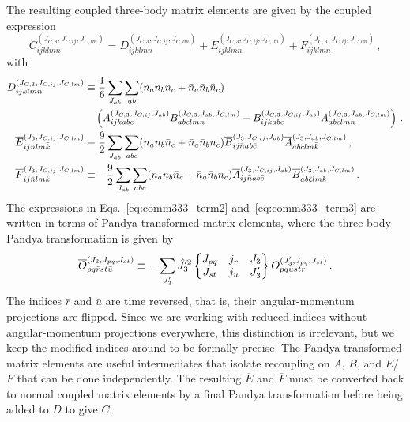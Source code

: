 The resulting coupled three-body matrix elements are given by the coupled expression
\begin{equation}
  C_{ijklmn}^{(J_{C,3}, J_{C,ij}, J_{C,lm})}
  = D_{ijklmn}^{(J_{C,3}, J_{C,ij}, J_{C,lm})}
  + E_{ijklmn}^{(J_{C,3}, J_{C,ij}, J_{C,lm})}
  + F_{ijklmn}^{(J_{C,3}, J_{C,ij}, J_{C,lm})}\,,
\end{equation}
with
\begin{align}
  \phantom{D_{ijklmn}^{(J_{C,3}, J_{C,ij}, J_{C,lm})}}
   & \begin{aligned}
    \mathllap{D_{ijklmn}^{(J_{C,3}, J_{C,ij}, J_{C,lm})}}
     & \equiv \frac{1}{6} \sum_{J_{ab}}
    \sum_{ab}
    (n_a n_b n_c + \bar{n}_a \bar{n}_b \bar{n}_c)
    \\
     & \quad \left(
    A_{ijkabc}^{(J_{C,3}, J_{C,ij}, J_{ab})}
    B_{abclmn}^{(J_{C,3}, J_{ab}, J_{C,lm})}
    - B_{ijkabc}^{(J_{C,3}, J_{C,ij}, J_{ab})}
    A_{abclmn}^{(J_{C,3}, J_{ab}, J_{C,lm})}
    \right)\,.
  \end{aligned}                         \\
   & \begin{aligned}
    \mathllap{\overline{E}_{ij\bar{n}lm\bar{k}}^{(J_{3},J_{C,ij},J_{C,lm})}} \equiv
    \frac{9}{2} \sum_{J_{ab}}
    \sum_{abc}
    (n_a n_b \bar{n}_c +  \bar{n}_a \bar{n}_b n_c)
    \overline{B}_{ij\bar{n}ab\bar{c}}^{(J_{3}, J_{C,ij}, J_{ab})}
    \overline{A}_{ab\bar{c}lm\bar{k}}^{(J_{3}, J_{ab}, J_{C,lm})}\,,
  \end{aligned}\label{eq:comm333_term2} \\
   & \begin{aligned}
    \mathllap{\overline{F}_{ij\bar{n}lm\bar{k}}^{(J_{3}, J_{C,ij}, J_{C,lm})}}
    \equiv -\frac{9}{2}
    \sum_{J_{ab}}
    \sum_{abc}
    (n_a n_b \bar{n}_c +  \bar{n}_a \bar{n}_b n_c)
    \overline{A}_{ij\bar{n}ab\bar{c}}^{(J_{3}, J_{C,ij}, J_{ab})}
    \overline{B}_{ab\bar{c}lm\bar{k}}^{(J_{3}, J_{ab}, J_{C,lm})}\,.
  \end{aligned}\label{eq:comm333_term3}
\end{align}
The expressions in Eqs.~\eqref{eq:comm333_term2} and~\eqref{eq:comm333_term3}
are written in terms of Pandya-transformed matrix elements,
where the three-body Pandya transformation is given by
\begin{equation}
  \overline{O}_{pq\bar{r}st\bar{u}}^{(J_{3}, J_{pq}, J_{st})}
  \equiv - \sum_{J_{3}'}
  \hat{J}_{3}^{\prime 2}
  \sixj{J_{pq}}{j_r}{J_{3}}{J_{st}}{j_u}{J_{3}'}
  O_{pqustr}^{(J_{3}', J_{pq}, J_{st})}\,.
\end{equation}
The indices $\bar{r}$ and $\bar{u}$ are time reversed,
that is, their angular-momentum projections are flipped.
Since we are working with reduced indices
without angular-momentum projections everywhere,
this distinction is irrelevant,
but we keep the modified indices around to be formally precise.
The Pandya-transformed matrix elements
are useful intermediates that isolate recoupling on $A$, $B$, and $E$/$F$
that can be done independently.
The resulting $\overline{E}$ and $\overline{F}$ must be
converted back to normal coupled matrix elements
by a final Pandya transformation
before being added to $D$ to give $C$.


